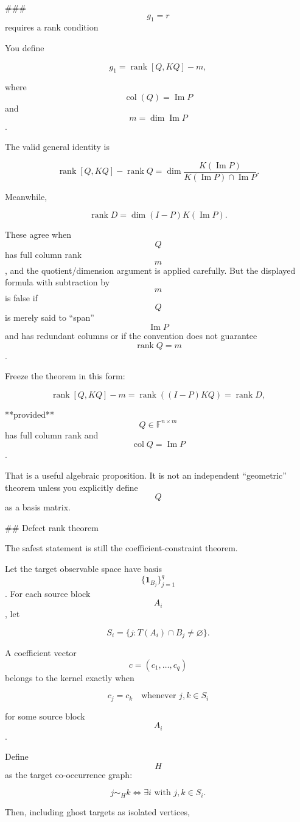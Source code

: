 ### $$g_1=r$$ requires a rank condition

You define

$$
g_1=\operatorname{rank}[Q,KQ]-m,
$$

where $$\operatorname{col}(Q)=\operatorname{Im}P$$ and $$m=\dim\operatorname{Im}P$$.

The valid general identity is

$$
\operatorname{rank}[Q,KQ]-\operatorname{rank}Q
=
\dim\frac{K(\operatorname{Im}P)}
{K(\operatorname{Im}P)\cap\operatorname{Im}P}.
$$

Meanwhile,

$$
\operatorname{rank}D
=
\dim (I-P)K(\operatorname{Im}P).
$$

These agree when $$Q$$ has full column rank $$m$$, and the quotient/dimension argument is applied carefully. But the displayed formula with subtraction by $$m$$ is false if $$Q$$ is merely said to “span” $$\operatorname{Im}P$$ and has redundant columns or if the convention does not guarantee $$\operatorname{rank}Q=m$$.

Freeze the theorem in this form:

$$
\boxed{
\operatorname{rank}[Q,KQ]-m
=
\operatorname{rank}((I-P)KQ)
=
\operatorname{rank}D,
}
$$

**provided** $$Q\in\mathbb F^{n\times m}$$ has full column rank and $$\operatorname{col}Q=\operatorname{Im}P$$.

That is a useful algebraic proposition. It is not an independent “geometric” theorem unless you explicitly define $$Q$$ as a basis matrix.

## Defect rank theorem

The safest statement is still the coefficient-constraint theorem.

Let the target observable space have basis $$\{\mathbf1_{B_j}\}_{j=1}^q$$. For each source block $$A_i$$, let

$$
S_i=\{j:T(A_i)\cap B_j\neq\varnothing\}.
$$

A coefficient vector $$c=(c_1,\ldots,c_q)$$ belongs to the kernel exactly when

$$
c_j=c_k
\quad
\text{whenever }j,k\in S_i
$$

for some source block $$A_i$$.

Define $$H$$ as the target co-occurrence graph:

$$
j\sim_H k
\iff
\exists i \text{ with } j,k\in S_i.
$$

Then, including ghost targets as isolated vertices,

